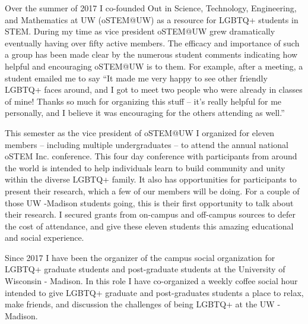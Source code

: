 \documentclass[10pt,reqno]{amsart}
\theoremstyle{remark}
\begin{document}
Over the summer of 2017 I co-founded Out in Science, Technology, Engineering, and Mathematics at UW (oSTEM@UW) as a resource for LGBTQ+ students in STEM. During my time as vice president oSTEM@UW grew dramatically eventually having over fifty active members. The efficacy and importance of such a group has been made clear by the numerous student comments indicating how helpful and encouraging oSTEM@UW is to them. For example, after a meeting, a student emailed me to say ``It made me very happy to see other friendly LGBTQ+ faces around, and I got to meet two people who were already in classes of mine! Thanks so much for organizing this stuff -- it's really helpful for me personally, and I believe it was encouraging for the others attending as well.''

This semester as the vice president of oSTEM@UW I organized for eleven members -- including multiple undergraduates -- to attend the annual national oSTEM Inc. conference. This four day conference with participants from around the world is intended to help individuals learn to build community and unity within the diverse LGBTQ+ family. It also has opportunities for participants to present their research, which a few of our members will be doing. For a couple of those UW -Madison students going, this is their first opportunity to talk about their research. I secured grants from on-campus and off-campus sources to defer the cost of attendance, and give these eleven students this amazing educational and social experience.

Since 2017 I have been the organizer of the campus social organization for LGBTQ+ graduate students and post-graduate students at the University of Wisconsin - Madison. In this role I have co-organized a weekly coffee social hour intended to give LGBTQ+ graduate and post-graduates students a place to relax, make friends, and discussion the challenges of being LGBTQ+ at the UW - Madison.

\newpage 


\end{document}
